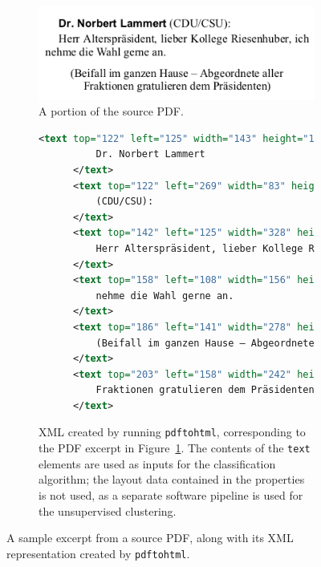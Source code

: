 \begin{figure}[p]
  \centering
  \begin{subfigure}[b]{0.6\textwidth} 
    \includegraphics[width=\textwidth]{figures/source.png}
    \caption{A portion of the source PDF.\label{fig:source_pdf}}
    \vspace{1cm}
  \end{subfigure}
  \begin{subfigure}[b]{\textwidth}
    \begin{lstlisting}[language=xml, morekeywords={text}]
      <text top="122" left="125" width="143" height="16" font="3">
          Dr. Norbert Lammert 
      </text>
      <text top="122" left="269" width="83" height="17" font="4">
          (CDU/CSU):
      </text>
      <text top="142" left="125" width="328" height="17" font="4">
          Herr Alterspräsident, lieber Kollege Riesenhuber, ich
      </text>
      <text top="158" left="108" width="156" height="17" font="4">
          nehme die Wahl gerne an.
      </text>
      <text top="186" left="141" width="278" height="17" font="4">
          (Beifall im ganzen Hause – Abgeordnete aller
      </text>
      <text top="203" left="158" width="242" height="17" font="4">
          Fraktionen gratulieren dem Präsidenten)
      </text>
    \end{lstlisting}
    \caption{XML created by running \texttt{pdftohtml}, corresponding to the PDF
      excerpt in Figure~\ref{fig:source_pdf}. The contents of the \texttt{text}
      elements are used as inputs for the classification algorithm; the layout
      data contained in the properties is not used, as a separate software
    pipeline is used for the unsupervised clustering.\label{fig:source_xml}}
  \end{subfigure}
  \caption{A sample excerpt from a source PDF, along with its XML representation
    created by \texttt{pdftohtml}.\label{fig:example}}
\end{figure}

